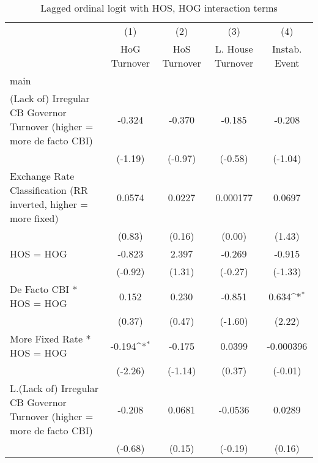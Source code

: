 {
\def\sym#1{\ifmmode^{#1}\else\(^{#1}\)\fi}
\begin{longtable}{l*{4}{c}}
\caption{Lagged ordinal logit with HOS, HOG interaction terms \label{hoshogintlagordLogLogDF}}\\
\hline\hline\endfirsthead\hline\endhead\hline\endfoot\endlastfoot
                &\multicolumn{1}{c}{(1)}&\multicolumn{1}{c}{(2)}&\multicolumn{1}{c}{(3)}&\multicolumn{1}{c}{(4)}\\
                &\multicolumn{1}{c}{HoG Turnover}&\multicolumn{1}{c}{HoS Turnover}&\multicolumn{1}{c}{L. House Turnover}&\multicolumn{1}{c}{Instab. Event}\\
\hline
main            &                  &                  &                  &                  \\
(Lack of) Irregular CB Governor Turnover (higher = more de facto CBI)&   -0.324         &   -0.370         &   -0.185         &   -0.208         \\
                &  (-1.19)         &  (-0.97)         &  (-0.58)         &  (-1.04)         \\
[1em]
Exchange Rate Classification (RR inverted, higher = more fixed)&   0.0574         &   0.0227         & 0.000177         &   0.0697         \\
                &   (0.83)         &   (0.16)         &   (0.00)         &   (1.43)         \\
[1em]
HOS = HOG       &   -0.823         &    2.397         &   -0.269         &   -0.915         \\
                &  (-0.92)         &   (1.31)         &  (-0.27)         &  (-1.33)         \\
[1em]
De Facto CBI * HOS = HOG&    0.152         &    0.230         &   -0.851         &    0.634\sym{*}  \\
                &   (0.37)         &   (0.47)         &  (-1.60)         &   (2.22)         \\
[1em]
More Fixed Rate * HOS = HOG&   -0.194\sym{*}  &   -0.175         &   0.0399         &-0.000396         \\
                &  (-2.26)         &  (-1.14)         &   (0.37)         &  (-0.01)         \\
[1em]
L.(Lack of) Irregular CB Governor Turnover (higher = more de facto CBI)&   -0.208         &   0.0681         &  -0.0536         &   0.0289         \\
                &  (-0.68)         &   (0.15)         &  (-0.19)         &   (0.16)         \\

\end{longtable}}

